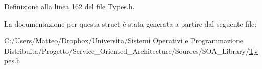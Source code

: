 Definizione alla linea 162 del file Types.\-h.



La documentazione per questa struct è stata generata a partire dal seguente file\-:\begin{DoxyCompactItemize}
\item 
C\-:/\-Users/\-Matteo/\-Dropbox/\-Universita/\-Sistemi Operativi e Programmazione Distribuita/\-Progetto/\-Service\-\_\-\-Oriented\-\_\-\-Architecture/\-Sources/\-S\-O\-A\-\_\-\-Library/\hyperlink{_types_8h}{Types.\-h}\end{DoxyCompactItemize}
